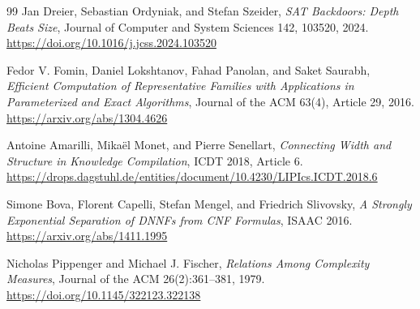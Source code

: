 \documentclass[11pt]{article}
\begin{document}
\begin{thebibliography}{99}
Jan Dreier, Sebastian Ordyniak, and Stefan Szeider,
\emph{SAT Backdoors: Depth Beats Size},
Journal of Computer and System Sciences 142, 103520, 2024.
\url{https://doi.org/10.1016/j.jcss.2024.103520}

Fedor V. Fomin, Daniel Lokshtanov, Fahad Panolan, and Saket Saurabh,
\emph{Efficient Computation of Representative Families with Applications in
Parameterized and Exact Algorithms},
Journal of the ACM 63(4), Article 29, 2016.
\url{https://arxiv.org/abs/1304.4626}

Antoine Amarilli, Mika\"el Monet, and Pierre Senellart,
\emph{Connecting Width and Structure in Knowledge Compilation},
ICDT 2018, Article 6.
\url{https://drops.dagstuhl.de/entities/document/10.4230/LIPIcs.ICDT.2018.6}

Simone Bova, Florent Capelli, Stefan Mengel, and Friedrich Slivovsky,
\emph{A Strongly Exponential Separation of DNNFs from CNF Formulas},
ISAAC 2016.
\url{https://arxiv.org/abs/1411.1995}

Nicholas Pippenger and Michael J. Fischer,
\emph{Relations Among Complexity Measures},
Journal of the ACM 26(2):361--381, 1979.
\url{https://doi.org/10.1145/322123.322138}

\end{thebibliography}
\end{document}
